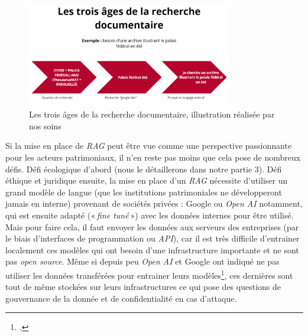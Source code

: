 \begin{figure}[h!]
	\centering
	\includegraphics[width=0.8\textwidth]{images/image23.png}
	\caption{Les trois âges de la recherche documentaire, illustration réalisée par nos soins}
	\label{fig:image23}
\end{figure}

Si la mise en place de \textit{RAG} peut être vue comme une perspective passionnante pour les acteurs patrimoniaux, il n’en reste pas moins que cela pose de nombreux défis. Défi écologique d’abord (nous le détaillerons dans notre partie 3). Défi éthique et juridique ensuite, la mise en place d’un \textit{RAG} nécessite d’utiliser un grand modèle de langue (que les institutions patrimoniales ne développeront jamais en interne) provenant de sociétés privées : Google ou \textit{Open AI} notamment, qui est ensuite adapté (« \textit{fine tuné} ») avec les données internes pour être utilisé. Mais pour faire cela, il faut envoyer les données aux serveurs des entreprises (par le biais d’interfaces de programmation ou \textit{API}), car il est très difficile d’entrainer localement ces modèles qui ont besoin d’une infrastructure importante et ne sont pas \textit{open source}. Même si depuis peu \textit{Open AI} et Google ont indiqué ne pas utiliser les données transférées pour entrainer leurs modèles\footcite{rochefort2023}, ces dernières sont tout de même stockées sur leurs infrastructures ce qui pose des questions de gouvernance de la donnée et de confidentialité en cas d’attaque.

